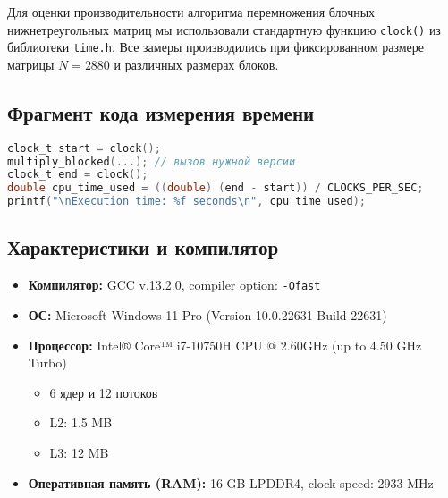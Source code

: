 \documentclass[14pt, russian]{matmex-diploma-custom}
\begin{document}
Для оценки производительности алгоритма перемножения блочных нижнетреугольных матриц мы использовали стандартную функцию \texttt{clock()} из библиотеки \texttt{time.h}. Все замеры производились при фиксированном размере матрицы $N = 2880$ и различных размерах блоков.

\subsection{Фрагмент кода измерения времени}

{\footnotesize
\begin{lstlisting}[language=C, basicstyle=\ttfamily\footnotesize]
clock_t start = clock();
multiply_blocked(...); // вызов нужной версии
clock_t end = clock();
double cpu_time_used = ((double) (end - start)) / CLOCKS_PER_SEC;
printf("\nExecution time: %f seconds\n", cpu_time_used);
\end{lstlisting}
}

\subsection{Характеристики и компилятор}
\begin{itemize}
    \item \textbf{Компилятор:} GCC v.13.2.0, compiler option: \texttt{-Ofast}
    \item \textbf{ОС:} Microsoft Windows 11 Pro (Version 10.0.22631 Build 22631)
    \item \textbf{Процессор:} Intel® Core™ i7-10750H CPU @ 2.60GHz (up to 4.50 GHz Turbo)
    \begin{itemize}
        \item 6 ядер и 12 потоков
        \item L2: 1.5 MB
        \item L3: 12 MB
    \end{itemize}
    \item \textbf{Оперативная память (RAM):} 16 GB LPDDR4, clock speed: 2933 MHz
\end{itemize}
\end{document}
